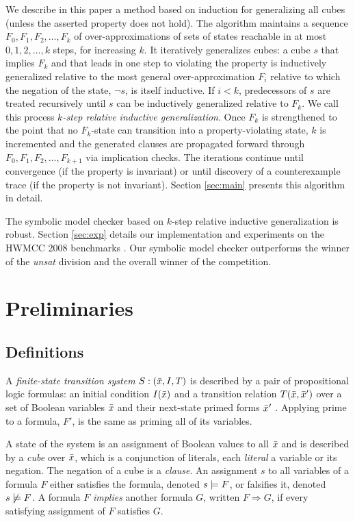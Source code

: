 \documentclass{llncs}
\newcommand{\bnot}{\neg}
\newcommand{\Bimplies}{\Rightarrow}
\begin{document}
We describe in this paper a method based on induction for generalizing
all cubes (unless the asserted property does not hold).  The algorithm
maintains a sequence $F_{0}, F_{1}, F_{2}, \ldots, F_{k}$ of
over-approximations of sets of states reachable in at most $0, 1, 2,
\ldots, k$ steps, for increasing $k$.  It iteratively generalizes
cubes: a cube $s$ that implies $F_k$ and that leads in one step to
violating the property is inductively generalized relative to the most
general over-approximation $F_{i}$ relative to which the negation of
the state, $\bnot s$, is itself inductive.  If $i<k$, predecessors of
$s$ are treated recursively until $s$ can be inductively generalized
relative to $F_{k}$.  We call this process {\it $k$-step relative
  inductive generalization}.  Once $F_{k}$ is strengthened to the
point that no $F_{k}$-state can transition into a property-violating
state, $k$ is incremented and the generated clauses are propagated
forward through $F_0,F_1,F_2,\ldots,F_{k+1}$ via implication checks.
The iterations continue until convergence (if the property is
invariant) or until discovery of a counterexample trace (if the
property is not invariant).  Section \ref{sec:main} presents this
algorithm in detail.

The symbolic model checker based on $k$-step relative inductive
generalization is robust.  Section \ref{sec:exp} details our
implementation and experiments on the HWMCC 2008 benchmarks
\cite{hwmcc08}.  Our symbolic model checker outperforms the winner of
the {\it unsat} division and the overall winner of the competition.

\section{Preliminaries}
\label{sec:prelims}

\subsection{Definitions}

A \emph{finite-state transition system} $S: (\vx, I, T)$ is described
by a pair of propositional logic formulas: an initial condition
$I(\vx)$ and a transition relation $T(\vx,\vx')$ over a set of Boolean
variables $\vx$ and their next-state primed forms $\vx'$
\cite{Clarke+Others:MC:2000}.  Applying prime to a formula, $F'$, is
the same as priming all of its variables.

A state of the system is an assignment of Boolean values to all $\vx$
and is described by a \emph{cube} over $\vx$, which is a conjunction
of literals, each \emph{literal} a variable or its negation.  The
negation of a cube is a \emph{clause}.  An assignment $s$ to all
variables of a formula $F$ either satisfies the formula, denoted
$\mymodels{F}{s}$, or falsifies it, denoted $\notmodels{F}{s}$.  A
formula $F$ \emph{implies} another formula $G$, written $F \Bimplies
G$, if every satisfying assignment of $F$ satisfies $G$.
\end{document}

